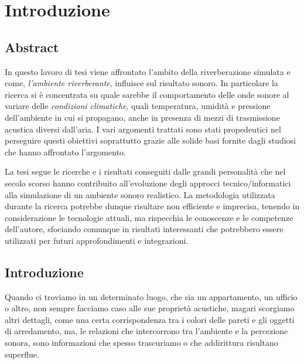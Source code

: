 
\chapter*{Introduzione}
\label{chp:Introduzione}
\section{Abstract}
In questo lavoro di tesi viene affrontato l’ambito della riverberazione simulata e come, \emph{l’ambiente riverberante}, influisce sul risultato sonoro. 
In particolare la ricerca si è concentrata su quale sarebbe il comportamento delle onde sonore al variare delle \emph{condizioni climatiche}, quali temperatura, umidità e pressione dell'ambiente in cui si propagano, anche in presenza di mezzi di trasmissione acustica diversi dall’aria. I vari argomenti trattati sono stati propedeutici nel perseguire questi obiettivi soprattutto grazie alle solide basi fornite dagli studiosi che hanno affrontato l’argomento.

La tesi segue le ricerche e i risultati conseguiti dalle grandi personalità che nel secolo scorso hanno contribuito all’evoluzione degli approcci tecnico/informatici alla simulazione di un ambiente sonoro realistico. La metodologia utilizzata durante la ricerca potrebbe dunque risultare non efficiente e imprecisa, tenendo in considerazione le tecnologie attuali, ma rispecchia le conoscenze e le competenze dell’autore, sfociando comunque in risultati interessanti che potrebbero essere utilizzati per futuri approfondimenti e integrazioni.

\pagebreak

\section{Introduzione}
Quando ci troviamo in un determinato luogo, che sia un appartamento, un ufficio o altro, non sempre facciamo caso alle sue proprietà acustiche, magari scorgiamo altri dettagli, come una certa corrispondenza tra i colori delle pareti e gli oggetti di arredamento, ma, le relazioni che intercorrono tra l’ambiente e la percezione sonora, sono informazioni che spesso trascuriamo o che addirittura risultano superflue.

